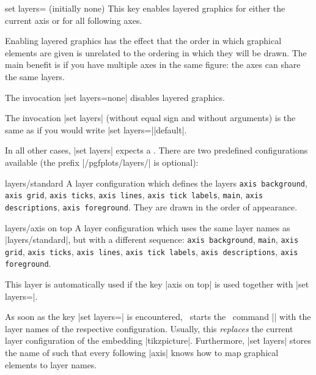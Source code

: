 {

\begin{pgfplotskey}{set layers= (initially none)}
   This key enables layered graphics for either the current axis or for all following axes. 

   Enabling layered graphics has the effect that the order in which graphical elements are given is unrelated to the ordering in which they will be drawn. The main benefit is if you have multiple axes in the same figure: the axes can share the same layers.

   The invocation |set layers=none| disables layered graphics.

   The invocation |set layers| (without equal sign and without arguments) is the same as if you would write |set layers=||default|.

   In all other cases, |set layers| expects a . There are two predefined configurations available (the prefix |/pgfplots/layers/| is optional):

   \begin{pgfplotskey}{layers/standard}
   	A layer configuration which defines the layers \texttt{axis background}, \texttt{axis grid}, \texttt{axis ticks}, \texttt{axis lines}, \texttt{axis tick labels}, \texttt{main}, \texttt{axis descriptions}, \texttt{axis foreground}. They are drawn in the order of appearance.
   \end{pgfplotskey}

   \begin{pgfplotskey}{layers/axis on top}
   	A layer configuration which uses the same layer names as |layers/standard|, but with a different sequence: \texttt{axis background}, \texttt{main}, \texttt{axis grid}, \texttt{axis ticks}, \texttt{axis lines}, \texttt{axis tick labels}, \texttt{axis descriptions}, \texttt{axis foreground}.

	This layer is automatically used if the key |axis on top| is used together with |set layers=|.
   \end{pgfplotskey}
  	
	As soon as the key |set layers=| is encountered, \PGFPlots\ starts the \pgfname\ command |\pgfsetlayers| with the layer names of the respective configuration. Usually, this \emph{replaces} the current layer configuration of the embedding |tikzpicture|. Furthermore, |set layers| stores the name of  such that every following |axis| knows how to map graphical elements to layer names.
	

\end{pgfplotskey}}
